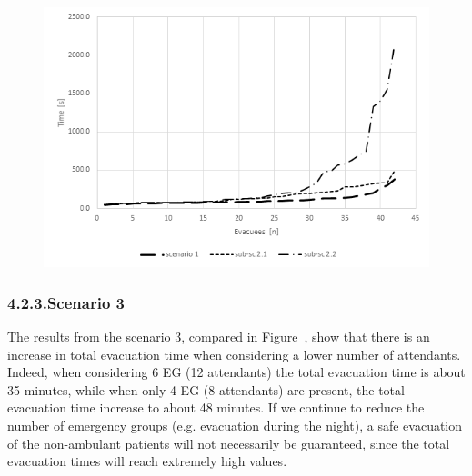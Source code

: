 \documentclass{style/llncs}
\begin{document}
\begin{figure}[tbp]%
\begin{mdcenter}%

\noindent{}\includegraphics[keepaspectratio=true,width=\dimmin{}{\dimwidth{1.00}}]{images/mean-evac-curve-s1_s2}{}%

\mdhr{}%

\noindent{}%
\end{mdcenter}\label{mean-evac-curve_s1-s2}%
\end{figure}%

\subsubsection{4.2.3.\hspace*{0.5em}Scenario 3}\label{path-s3}%

\noindent{}The results from the scenario 3, compared in Figure~, show that there is an 
increase in total evacuation time when considering a lower number of 
attendants. Indeed, when considering 6 EG (12 attendants) the total 
evacuation time is about 35 minutes, while when only 4 EG (8 attendants) 
are present, the total evacuation time increase to about 48 minutes. 
If we continue to reduce the number of emergency groups (e.g. evacuation
 during the night), a safe evacuation of the non-ambulant patients will 
 not necessarily be guaranteed, since the total evacuation times will reach
  extremely high values.%
\end{document}
